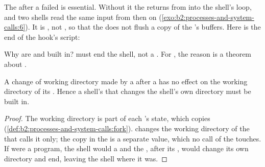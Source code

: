 The  after a failed  is essential. Without it the  returns from  into the shell's
loop, and two shells read the same input from then on (\cref{exo:b2:processes-and-system-calls:6}). It is
, not , so that the  does not flush a copy of the 's buffers. Here is the end of
the hook's script:


Why are  and  built in?  must end the shell, not a . For , the reason is
a theorem about .

\begin{proposition}\label{prop:b2:processes-and-system-calls:cd-builtin}
A change of working directory made by a  after a  has no effect on the working directory of its
. Hence a shell's  that changes the shell's own directory must be built in.
\end{proposition}

\begin{proof}
The working directory is part of each 's state, which  copies (\cref{def:b2:processes-and-system-calls:fork}).
 changes the working directory of the  that calls it only; the copy in the  is a separate
value, which no call of the  touches. If  were a program, the shell would  a  and the ,
after its , would change its own directory and end, leaving the shell where it was.
\end{proof}

